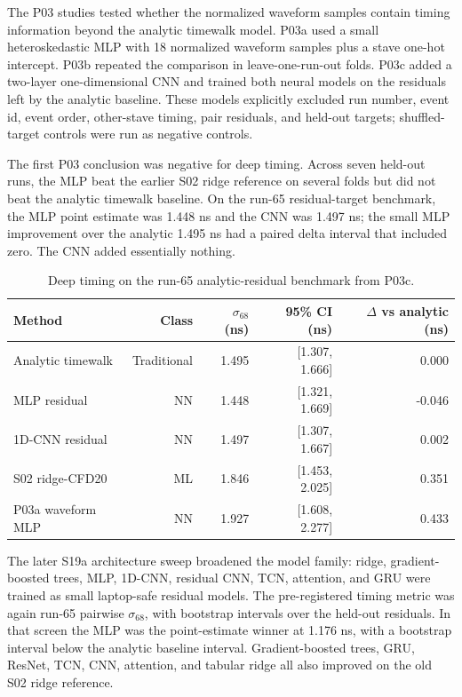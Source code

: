 The P03 studies tested whether the normalized waveform samples contain timing
information beyond the analytic timewalk model.  P03a used a small
heteroskedastic MLP with 18 normalized waveform samples plus a stave one-hot
intercept.  P03b repeated the comparison in leave-one-run-out folds.  P03c
added a two-layer one-dimensional CNN and trained both neural models on the
residuals left by the analytic baseline.  These models explicitly excluded run
number, event id, event order, other-stave timing, pair residuals, and held-out
targets; shuffled-target controls were run as negative controls.

The first P03 conclusion was negative for deep timing.  Across seven held-out
runs, the MLP beat the earlier S02 ridge reference on several folds but did not
beat the analytic timewalk baseline.  On the run-65 residual-target benchmark,
the MLP point estimate was 1.448 ns and the CNN was 1.497 ns; the small
MLP improvement over the analytic 1.495 ns had a paired delta interval that
included zero.  The CNN added essentially nothing.

\begin{table}[H]
\centering
\caption{Deep timing on the run-65 analytic-residual benchmark from P03c.}
\begin{tabular}{lrrrr}
\toprule
Method & Class & \(\sigma_{68}\) (ns) & 95\% CI (ns) & \(\Delta\) vs analytic (ns) \\
\midrule
Analytic timewalk & Traditional & 1.495 & [1.307, 1.666] & 0.000 \\
MLP residual & NN & 1.448 & [1.321, 1.669] & -0.046 \\
1D-CNN residual & NN & 1.497 & [1.307, 1.667] & 0.002 \\
S02 ridge-CFD20 & ML & 1.846 & [1.453, 2.025] & 0.351 \\
P03a waveform MLP & NN & 1.927 & [1.608, 2.277] & 0.433 \\
\bottomrule
\end{tabular}
\end{table}

The later S19a architecture sweep broadened the model family: ridge,
gradient-boosted trees, MLP, 1D-CNN, residual CNN, TCN, attention, and GRU were
trained as small laptop-safe residual models.  The pre-registered timing metric
was again run-65 pairwise \(\sigma_{68}\), with bootstrap intervals over the
held-out residuals.  In that screen the MLP was the point-estimate winner at
1.176 ns, with a bootstrap interval below the analytic baseline interval.
Gradient-boosted trees, GRU, ResNet, TCN, CNN, attention, and tabular ridge all
also improved on the old S02 ridge reference.

